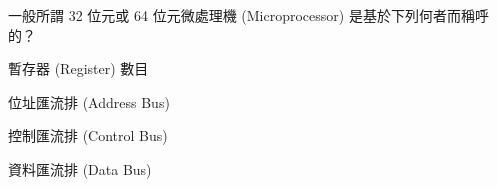 \ifx\ntpcNinetyThree\undefined[93學年基北區] \fi
一般所謂 32 位元或 64 位元微處理機 (Microprocessor) 是基於下列何者而稱呼的？
  \begin{optionlist}
  \item 暫存器 (Register) 數目
  \item 位址匯流排 (Address Bus)
  \item 控制匯流排 (Control Bus)
  \item 資料匯流排 (Data Bus)\label{ntpc-93-a5}
  \end{optionlist}